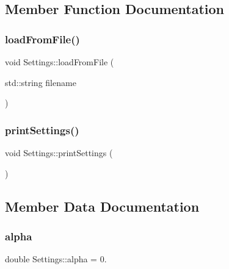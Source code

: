\subsection{Member Function Documentation}
\mbox{\label{structSettings_a55f95e3b6e7379bef4f8399a2cd670cc}} 
\subsubsection{\texorpdfstring{loadFromFile()}{loadFromFile()}}
{\footnotesize\ttfamily void Settings\+::load\+From\+File (\begin{DoxyParamCaption}\item[{std\+::string}]{filename }\end{DoxyParamCaption})}

\mbox{\label{structSettings_a68ce38117dcef2cbdd3bd17f127b3078}} 
\subsubsection{\texorpdfstring{printSettings()}{printSettings()}}
{\footnotesize\ttfamily void Settings\+::print\+Settings (\begin{DoxyParamCaption}{ }\end{DoxyParamCaption})}



\subsection{Member Data Documentation}
\mbox{\label{structSettings_a8b3721d24a5417caa0f2ad6f5eb85782}} 
\subsubsection{\texorpdfstring{alpha}{alpha}}
{\footnotesize\ttfamily double Settings\+::alpha = 0.}

\mbox{\label{structSettings_a45307d3dcb2847f242815018498e3532}} 
